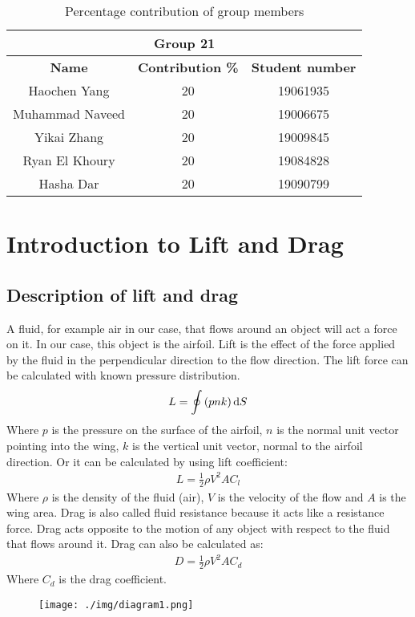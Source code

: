 \begin{table}[H]
    \caption{Percentage contribution of group members}
    \begin{center}
        \begin{tabular}{||c|c|c||}
            \hline
            \multicolumn{3}{||c||}{\textbf{Group 21}}                            \\
            \hline
            \textbf{Name}   & \textbf{Contribution \%} & \textbf{Student number} \\
            \hline
            \hline
            Haochen Yang    & 20                       & 19061935                \\
            Muhammad Naveed & 20                       & 19006675                \\
            Yikai Zhang     & 20                       & 19009845                \\
            Ryan El Khoury  & 20                       & 19084828                \\
            Hasha Dar       & 20                       & 19090799                \\
            \hline
        \end{tabular}
    \end{center}
\end{table}
\section{Introduction to Lift and Drag}
\subsection{Description of lift and drag}
A fluid, for example air in our case, that flows around an object will act a force on it. In our case, this object is the airfoil. Lift is the effect of the force applied by the fluid in the perpendicular direction to the flow direction. The lift force can be calculated with known pressure distribution.
\begin{align}
    L = \oint \left(p n k \right)\dif S
\end{align}
Where $p$ is the pressure on the surface of the airfoil, $n$ is the normal unit vector pointing into the wing, $k$ is the vertical unit vector, normal to the airfoil direction. Or it can be calculated by using lift coefficient:
\begin{align}
    L = \frac{1}{2} \rho V^2 A C_l
\end{align}
Where $\rho$ is the density of the fluid (air), $V$ is the velocity of the flow and $A$ is the wing area. Drag is also called fluid resistance because it acts like a resistance force. Drag acts opposite to the motion of any object with respect to the fluid that flows around it. Drag can also be calculated as:
\begin{align}
    D = \frac{1}{2} \rho V^2 A C_d
\end{align}
Where $C_d$ is the drag coefficient.
\begin{figure}[H]
    \centering
    \texttt{[image: ./img/diagram1.png]}
    \caption{}
\end{figure}
